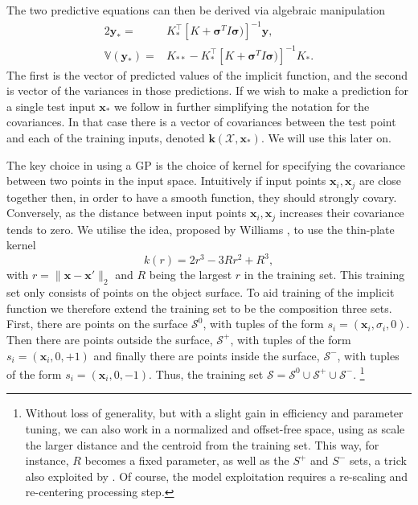 The two predictive equations can then be derived via algebraic manipulation
\begin{alignat}{2}
	\mathbf{y}_* = & K_*^\top [K + \boldsymbol{\sigma}^{T} I \boldsymbol{\sigma})]^{-1}\mathbf{y}, \label{eq:f_prediction}\\
	\mathbb{V}(\mathbf{y}_*) = & K_{**} - K_*^\top[K + \boldsymbol{\sigma}^{T} I \boldsymbol{\sigma})]^{-1} K_*. \label{eq:variance_f}
\end{alignat}
The first is the vector of predicted values of the implicit function, and the second is vector of the variances in those predictions. If we wish to make a prediction for a single test input $\mathbf{x_*}$ we follow \cite{Rasmussen2006Gaussian} in further simplifying the notation for the covariances. In that case there is a vector of covariances between the test point and each of the training inputs, denoted $\mathbf{k}(\mathcal{X},\mathbf{x}_*)$. We will use this later on.

The key choice in using a GP is the choice of kernel for specifying the covariance between two points in the input space. Intuitively if input points $\mathbf{x}_i, \mathbf{x}_j$ are close together then, in order to have a smooth function, they should strongly covary. Conversely, as the distance between input points $\mathbf{x}_i, \mathbf{x}_j$ increases their covariance tends to zero.
We utilise the idea, proposed by Williams \cite{Williams2007Gaussian}, to use the thin-plate kernel 
\begin{equation}
k(r) = 2r^{3} - 3Rr^2 + R^3,
\end{equation}
with $r = \| \mathbf{x} - \mathbf{x}' \|_2$ and $R$ being the largest $r$ in the training set. This training set only consists of points on the object surface. To aid training of the implicit function we therefore extend the training set to be the composition three sets. First, there are points on the surface $\mathcal{S}^0$, with tuples of the form $s_i = (\mathbf{x}_i, \sigma_i, 0)$. Then there are points outside the surface, $\mathcal{S}^+$, with tuples of the form $s_i = (\mathbf{x}_i, 0, +1)$ and finally there are points inside the surface, $\mathcal{S}^-$, with tuples of the form $s_i = (\mathbf{x}_i, 0, -1)$. Thus, the training set $\mathcal{S} = \mathcal{S}^0 \cup \mathcal{S}^+ \cup \mathcal{S}^-$. \footnote{Without loss of generality, but with a slight gain in efficiency and parameter tuning, we can also work in a normalized and offset-free space, using as scale the larger distance and the centroid from the training set. This way, for instance, $R$ becomes a fixed parameter, as well as the $S^+$ and $S^-$ sets, a trick also exploited by \cite{Li2016Dexterous}. Of course, the model exploitation requires a re-scaling and re-centering processing step.}

